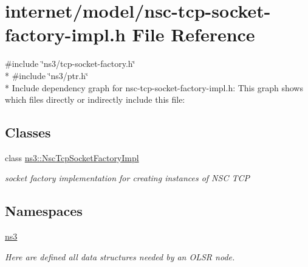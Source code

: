 \hypertarget{nsc-tcp-socket-factory-impl_8h}{}\section{internet/model/nsc-\/tcp-\/socket-\/factory-\/impl.h File Reference}
\label{nsc-tcp-socket-factory-impl_8h}
{\ttfamily \#include \char`\"{}ns3/tcp-\/socket-\/factory.\+h\char`\"{}}\\*
{\ttfamily \#include \char`\"{}ns3/ptr.\+h\char`\"{}}\\*
Include dependency graph for nsc-\/tcp-\/socket-\/factory-\/impl.h\+:
This graph shows which files directly or indirectly include this file\+:
\subsection*{Classes}
\begin{DoxyCompactItemize}
\item 
class \hyperlink{classns3_1_1NscTcpSocketFactoryImpl}{ns3\+::\+Nsc\+Tcp\+Socket\+Factory\+Impl}
\begin{DoxyCompactList}\small\item\em socket factory implementation for creating instances of N\+SC T\+CP \end{DoxyCompactList}\end{DoxyCompactItemize}
\subsection*{Namespaces}
\begin{DoxyCompactItemize}
\item 
 \hyperlink{namespacens3}{ns3}
\begin{DoxyCompactList}\small\item\em Here are defined all data structures needed by an O\+L\+SR node. \end{DoxyCompactList}\end{DoxyCompactItemize}
